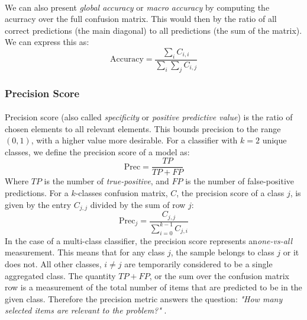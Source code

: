 \documentclass[12pt,letterpaper]{article}
\begin{document}
\paragraph*{}We can also present \textit{global accuracy} or \textit{macro accuracy} by computing the acurracy over the full confusion matrix. This would then by the ratio of all correct predictions (the main diagonal) to all predictions (the sum of the matrix). We can express this as:
\begin{equation}
\text{Accuracy} = \frac{\sum_{i}C_{i,i}}{\sum_{i}\sum_{j}C_{i,j}}
\end{equation}


\subsubsection{Precision Score}

\paragraph*{}Precision score (also called \textit{specificity} or \textit{positive predictive value}) is the ratio of chosen elements to all relevant elements. This bounds precision to the range $(0,1)$, with a higher value more desirable. For a classifier with $k = 2$ unique classes, we define the precision score of a model as:
\begin{equation}
\label{eqn-BinaryPrecision}
\text{Prec} = \frac{TP}{TP + FP}
\end{equation}
Where $TP$ is the number of \textit{true-positive}, and $FP$ is the number of false-positive predictions. For a $k$-classes confusion matrix, $C$, the precision score of a class $j$, is given by the entry $C_{j,j}$ divided by the sum of row $j$:
\begin{equation}
\label{eqn-KPrecision}
\text{Prec}_j = \frac{C_{j,j}}{\sum_{i=0}^{k-1}C_{j,i}}
\end{equation}
In the case of a multi-class classifier, the precision score represents an\textit{one-vs-all} measurement. This means that for any class $j$, the sample belongs to class $j$ or it does not. All other classes, $i \neq j$ are temporarily considered to be a single aggregated class. The quantity $TP + FP$, or the sum over the confusion matrix row is a measurement of the total number of items that are predicted to be in the given class. Therefore the precision metric answers the question: \textit{"How many selected items are relevant to the problem?"} \cite{Geron,James}.
\end{document}
